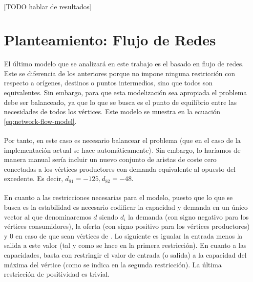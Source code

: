 \documentclass{article}
\begin{document}
    \paragraph{}
    [TODO hablar de resultados]


  \section{Planteamiento: Flujo de Redes}
  \label{section:network-flow}

    \paragraph{}
    El último modelo que se analizará en este trabajo es el basado en  flujo de redes. Este se diferencia de los anteriores porque no impone ninguna restricción con respecto a orígenes, destinos o puntos intermedios, sino que todos son equivalentes. Sin embargo, para que esta modelización sea apropiada el problema debe ser balanceado, ya que lo que se busca es el punto de equilibrio entre las necesidades de todos los vértices.  Este modelo se muestra en la ecuación \eqref{eq:network-flow-model}.

    \paragraph{}
    Por tanto, en este caso es necesario balancear el problema (que en el caso de la implementación actual se hace automáticamente). Sin embargo, lo haríamos de manera manual sería incluir un nuevo conjunto de aristas de coste cero conectadas a los vértices productores con demanda equivalente al opuesto del excedente. Es decir, $d_{81} = -125, d_{82} = -48$.

    \paragraph{}
    En cuanto a las restricciones necesarias para el modelo, puesto que lo que se busca es la estabilidad es necesario codificar la capacidad y demanda en un único vector al que denominaremos $d$ siendo $d_{i}$ la demanda (con signo negativo para los vértices consumidores), la oferta (con signo positivo para los vértices productores) y 0 en caso de que sean vértices de . Lo siguiente es igualar la entrada menos la salida a este valor (tal y como se hace en la primera restricción). En cuanto a las capacidades, basta con restringir el valor de entrada (o salida) a la capacidad del máxima del vértice (como se indica en la segunda restricción). La última restricción de positividad es trivial.
\end{document}
